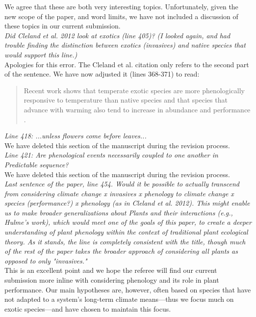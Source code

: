 \documentclass[11pt,a4paper]{letter}
\begin{document}
\begin{letter}{}
We agree that these are both very interesting topics. Unfortunately, given the new scope of the paper, and word limits, we have not included a discussion of these topics in our current submission. \\

\emph{Did Cleland et al. 2012 look at exotics (line 405)? (I looked again, and had trouble finding the distinction between exotics (invasives) and native species that would support this line.) }\\ 

Apologies for this error. The Cleland et al. citation only refers to the second part of the sentence. We have now adjusted it (lines 368-371) to read: 
\begin{quote}
Recent work shows that temperate exotic species are more phenologically responsive to temperature than native species \citep{Willis:2010al,wolkovichAmBot2013} and that species that advance with warming also tend to increase in abundance and performance \citep{Cleland:2012vn}. 
\end{quote}

\emph{Line 418: ...unless flowers come before leaves... }\\

We have deleted this section of the manuscript during the revision process.\\

\emph{Line 421: Are phenological events necessarily coupled to one another in Predictable sequence? }\\

We have deleted this section of the manuscript during the revision process.\\

\emph{Last sentence of the paper, line 454. Would it be possible to actually transcend from considering climate change x invasives x phenology to climate change x species (performance?) x phenology (as in Cleland et al. 2012). This might enable us to make broader generalizations about Plants and their interactions (e.g., Hulme's work), which would meet one of the goals of this paper, to create a deeper understanding of plant phenology within the context of traditional plant ecological theory. As it stands, the line is completely consistent with the title, though much of the rest of the paper takes the broader approach of considering all plants as opposed to only "invasives." }\\

This is an excellent point and we hope the referee will find our current submission more inline with considering phenology and its role in plant performance. Our main hypotheses are, however, often based on species that have not adapted to a system's long-term climate means---thus we focus much on exotic species---and have chosen to maintain this focus. \\


\end{letter}
\end{document}
